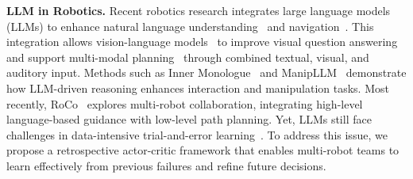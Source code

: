
\noindent \textbf{LLM in Robotics.}
Recent robotics research integrates large language models (LLMs) to enhance natural language understanding~\cite{khurana2023natural} and navigation~\cite{wen2025zero,wen2024secure}. This integration allows vision-language models~\cite{zhang2021vinvl} to improve visual question answering~\cite{lin2023medical} and support multi-modal planning~\cite{shao2023prompting} through combined textual, visual, and auditory input. Methods such as Inner Monologue~\cite{huang2022inner} and ManipLLM~\cite{li2024manipllm} demonstrate how LLM-driven reasoning enhances interaction and manipulation tasks. Most recently, RoCo~\cite{mandi2024roco} explores multi-robot collaboration, integrating high-level language-based guidance with low-level path planning. Yet, LLMs still face challenges in data-intensive trial-and-error learning~\cite{shinn2024reflexion}. To address this issue, we propose a retrospective actor-critic framework that enables multi-robot teams to learn effectively from previous failures and refine future decisions.